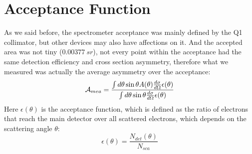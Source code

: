 \begin{comment}
\bigskip
One could also estimate the rate from measurement. 
\begin{eqaution}
    \sigma = \sqrt{\frac{1}{R/30}}
\end{eqaution}
\begin{table}[!h]
    \centering
    \begin{tabular}{c c c | c c c c c c}
	\hline
	Target	& run	& I $(\mu A)$   & \thead{rms \\ ($ppm$)} & \thead{rms@$70\ \mu A$ \\ ($ppm$)} & \thead{bcm res. \\ ($ppm$)}   & \thead{bpm res. \\ ($ppm$)}   & \thead{cor. rms \\ ($ppm$)}  & \thead{rate \\ ($GHz$)}  \\
	\hline
	C12	& 4133	& 86.2	& 143	& 158.7	& 20	& 25	& 150.4	& 1.326	\\
	D-Pb-D	& 4112	& 67.7	& 93	& 91.5	& 20	& 25	& 82.9	& 4.365	\\
	\hline
    \end{tabular}
    \caption{The corrected rms was calculated as: $\sqrt{\frac{\sigma^2 - \sigma^2_{bcm} - \sigma^2_{bpm}}{1 + 0.26^2}}$}
\end{table}
The C graphite target has a thickness of $1.991\ mm$ and a density of 
\end{comment}


\section{Acceptance Function}
As we said before, the spectrometer acceptance was mainly defined by the Q1 
collimator, but other devices may also have affections on it. And the accepted
area was not tiny ($0.00377 \ sr$), not every point within the acceptance had
the same detection efficiency and cross section asymmetry, therefore what
we measured was actually the average asymmetry over the acceptance:
\begin{equation}
    \mathcal{A}_{mea} = \frac{\int d\theta \sin\theta A(\theta) \frac{d\sigma}{d\Omega} \epsilon(\theta)}{\int d\theta \sin\theta \frac{d\sigma}{d\Omega} \epsilon(\theta)}
    \label{eq:acceptance_function}
\end{equation}
Here $\epsilon(\theta)$ is the acceptance function, which is defined as
the ratio of electrons that reach the main detector over all scattered
electrons, which depends on the scattering angle $\theta$:
\begin{equation}
    \epsilon(\theta) = \frac{N_{det}(\theta)}{N_{sca}}
    \label{eq:acceptance_definition}
\end{equation}

